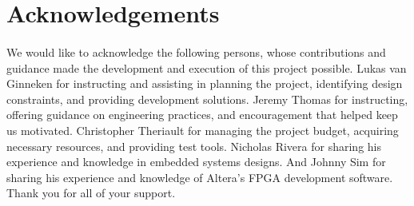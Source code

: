 \documentclass[pdftex,12pt,a4paper]{article}
\begin{document}
\pagebreak
\section{Acknowledgements}

\paragraph{}
We would like to acknowledge the following persons, whose contributions and guidance made the development and execution of this project possible.
\newline
\newline
Lukas van Ginneken for instructing and assisting in planning the project, identifying design constraints, and providing development solutions. Jeremy Thomas for instructing, offering guidance on engineering practices, and encouragement that helped keep us motivated. Christopher Theriault for managing the project budget, acquiring necessary resources, and providing test tools. Nicholas Rivera for sharing his experience and knowledge in embedded systems designs. And Johnny Sim for sharing his experience and knowledge of Altera's FPGA development software.
\newline
\newline
Thank you for all of your support.



\end{document}
